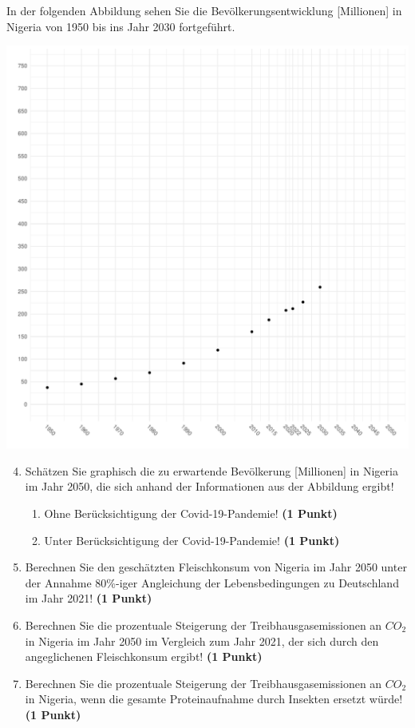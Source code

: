 \documentclass[a4paper, 9pt]{scrartcl}\usepackage[]{graphicx}\usepackage[]{xcolor}
\makeatletter
\def\maxwidth{ %
  \ifdim\Gin@nat@width>\linewidth
    \linewidth
  \else
    \Gin@nat@width
  \fi
}
\newenvironment{knitrout}{}{} %
\makeatother
\begin{document}
\newpage

In der folgenden Abbildung sehen Sie die Bevölkerungsentwicklung [Millionen] in Nigeria von 1950 bis ins Jahr 2030 fortgeführt.

\begin{knitrout}
\color{fgcolor}

{\centering \includegraphics[width=\maxwidth]{img/math-14-c-1} 

}


\end{knitrout}

\begin{enumerate}
  \setcounter{enumi}{3}  
\item Schätzen Sie graphisch die zu erwartende Bevölkerung [Millionen] in Nigeria im Jahr 2050, die sich anhand der Informationen aus der Abbildung ergibt!
\begin{enumerate}
\item Ohne Berücksichtigung der Covid-19-Pandemie! \textbf{(1 Punkt)}
\item Unter Berücksichtigung der Covid-19-Pandemie! \textbf{(1 Punkt)}
\end{enumerate}
\item Berechnen Sie den geschätzten Fleischkonsum von Nigeria im Jahr 2050 unter der Annahme 80\%-iger Angleichung der Lebensbedingungen zu Deutschland im Jahr 2021! \textbf{(1 Punkt)}
\item Berechnen Sie die prozentuale Steigerung der Treibhausgasemissionen an $CO_2$ in Nigeria im Jahr 2050 im Vergleich zum Jahr 2021, der sich durch den angeglichenen Fleischkonsum ergibt! \textbf{(1 Punkt)}
\item Berechnen Sie die prozentuale Steigerung der Treibhausgasemissionen an $CO_2$ in Nigeria, wenn die gesamte Proteinaufnahme durch Insekten ersetzt würde! \textbf{(1 Punkt)}
\end{enumerate}
\end{document}
